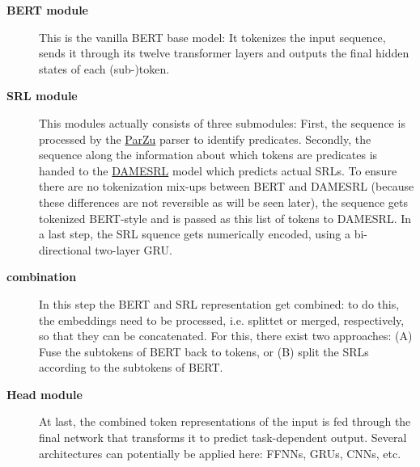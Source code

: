 \begin{description}
	\item[\textbf{BERT module}] This is the vanilla BERT base model: It tokenizes the input sequence, sends it through its twelve transformer layers and outputs the final hidden states of each (sub-)token.
  \item[\textbf{SRL module}] This modules actually consists of three submodules: First, the sequence is processed by the \href{https://github.com/rsennrich/ParZu}{ParZu} \citep{sennrich2009new} parser to identify predicates.
	Secondly, the sequence along the information about which tokens are predicates is handed to the \href{https://liir.cs.kuleuven.be/software_pages/damesrl.php}{DAMESRL} model \citep{do2018flexible} which predicts actual SRLs.
	To ensure there are no tokenization mix-ups between BERT and DAMESRL (because these differences are not reversible as will be seen later), the sequence gets tokenized BERT-style and is passed as this list of tokens to DAMESRL. In a last step,
	the SRL squence gets numerically encoded, using a bi-directional two-layer GRU.
  \item[\textbf{combination}] In this step the BERT and SRL representation get combined: to do this, the embeddings need to be processed, i.e. splittet or merged, respectively, so that they can be concatenated.
	For this, there exist two approaches:
	(A) Fuse the subtokens of BERT back to tokens, or (B) split the SRLs according to the subtokens of BERT.
  \item[\textbf{Head module}] At last, the combined token representations of the input is fed through the final network that transforms it to predict task-dependent output. Several architectures can potentially be applied here: FFNNs, GRUs, CNNs, etc.
\end{description}

\begin{landscape}\centering
\end{landscape}


